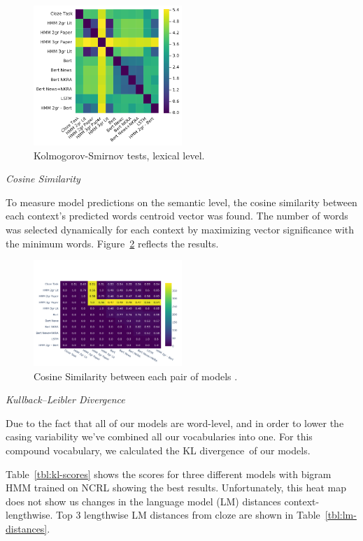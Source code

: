 \documentclass[a4paper]{article}
\newcommand{\head}[1]{\vspace{0.5em}\emph{#1}\vspace{0.25em}}
\begin{document}
\begin{figure}
\caption{Kolmogorov-Smirnov tests, lexical level.}
\label{fig:ks-lexical}
\centering
\includegraphics[width=0.5\textwidth]{figures/pdf/ks-lexical.pdf}
\end{figure}

\head{Cosine Similarity}

To measure model predictions on the semantic level, the cosine similarity between each context’s predicted words centroid vector was found. The number of words was selected dynamically for each context by maximizing vector significance with the minimum words. Figure~\ref{fig:cosine-lexical} reflects the results.
\begin{figure}
\caption{Cosine Similarity between each pair of models .}
\label{fig:cosine-lexical}
\centering
\includegraphics[width=0.5\textwidth]{figures/pdf/cosine-similarity-lexical.pdf}
\end{figure}

\head{Kullback–Leibler Divergence}

Due to the fact that all of our models are word-level, and in order to lower the casing variability we've combined all our vocabularies into one. For this compound vocabulary, we calculated the KL divergence of our models.

Table~\ref{tbl:kl-scores} shows the scores for three different models with
bigram HMM trained on NCRL showing the best results. Unfortunately, this heat map does not show us changes in the language model (LM) distances context-lengthwise. Top 3 lengthwise LM distances from cloze are shown in Table~\ref{tbl:lm-distances}.
\end{document}
